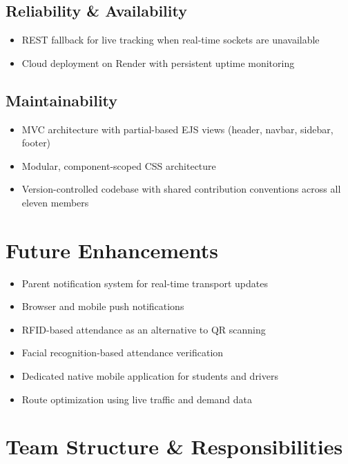 \documentclass[11pt,a4paper]{report}
\begin{document}
\section{Reliability \& Availability}
\begin{itemize}[leftmargin=1.3em]
  \item REST fallback for live tracking when real-time sockets are unavailable
  \item Cloud deployment on Render with persistent uptime monitoring
\end{itemize}

\section{Maintainability}
\begin{itemize}[leftmargin=1.3em]
  \item MVC architecture with partial-based EJS views (header, navbar, sidebar, footer)
  \item Modular, component-scoped CSS architecture
  \item Version-controlled codebase with shared contribution conventions across all eleven members
\end{itemize}

\chapter{Future Enhancements}
\begin{itemize}[leftmargin=1.3em]
  \item Parent notification system for real-time transport updates
  \item Browser and mobile push notifications
  \item RFID-based attendance as an alternative to QR scanning
  \item Facial recognition-based attendance verification
  \item Dedicated native mobile application for students and drivers
  \item Route optimization using live traffic and demand data
\end{itemize}

\chapter{Team Structure \& Responsibilities}
\label{chap:team}
\end{document}

